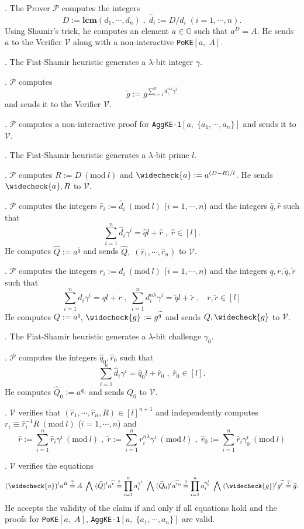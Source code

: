 \documentclass[11pt, lettersize, notitlepage, leqno, footskip=0.6cm]{article}
\newcommand{\pl}{\prod\limits}
\newcommand{\slim}{\sum\limits}
\newcommand{\wti}{\widetilde}
\newcommand{\mc}{\mathcal}
\newcommand{\mb}{\mathbb}
\newcommand{\mbf}{\mathbf}
\newcommand{\lam}{\lambda}
\newcommand{\what}{\widehat}
\newcommand{\weck}{\widecheck}
\newcommand{\vs}{\vspace{-0.15cm}}
\newcommand{\noin}{\noindent}
\newcommand{\sta}{\stackrel{?}{=}}
\newcommand{\Mod}[1]{\ (\mathrm{mod}\ #1)}
\newcommand{\LCM}{\mbf{lcm}}
\numberwithin{equation}{section}
\begin{document}
\begin{prf1} . The Prover $\mc{P}$ computes the integers \vs $$D:= \LCM(d_1,\cdots,d_n)\;,\;\what{d}_i:= D/d_i\;(i=1,\cdots,n).$$ Using Shamir's trick, he computes an element $a\in\mb{G}$ such that $a^D = A$. He sends $a$ to the Verifier $\mc{V}$ along with a non-interactive \verb|PoKE|$[a,\;A]$.

\noin 2. The Fiat-Shamir heuristic generates a $\lam$-bit integer $\gamma$.

\noin 3. $\mc{P}$ computes $$\wti{g}:= g^{\slim_{i=1}^n d_i^{n\lam}\gamma^i}$$ and sends it to the Verifier $\mc{V}$. 

\noin 4. $\mc{P}$ computes a non-interactive proof for \verb|AggKE-1|$[a,\;\{a_1,\cdots,a_n\}]$ and sends it to $\mc{V}$.

\noin 5. The Fiat-Shamir heuristic generates a $\lam$-bit prime $l$.

\noin 6. $\mc{P}$ computes $R:= D\Mod{l}$ and $\weck{a}:= a^{(D-R)/l}$. He sends $\weck{a}, R$ to $\mc{V}$.

\noin 7. $\mc{P}$ computes the integers $\what{r}_i:= \what{d}_i\Mod{l}$ ($i=1,\cdots,n$) and the integers $\what{q},\what{r}$ such that \vs $$\slim_{i=1}^n \what{d}_i\gamma^i = \what{q} l + \what{r}\;,\;\what{r}\in [l].$$ He computes $\what{Q}:= a^{\what{q}}$ and sends $\what{Q},\; (\what{r}_1,\cdots,\what{r}_n)$ to $\mc{V}$.

\noin 8. $\mc{P}$ computes the integers ${r}_i:= {d}_i\Mod{l}$ ($i=1,\cdots,n$) and the integers $q,r,\wti{q},\wti{r}$ such that \vs $$\slim_{i=1}^n d_i\gamma^i = ql+r\;,\;\slim_{i=1}^n {d}_i^{n\lam}\gamma^i = \wti{q}l+\wti{r}\;,\;\;\;r,\wti{r}\in[l] $$ He computes ${Q}:= a^q$, $\weck{g}:= g^{\wti{q}}$ and sends ${Q}, \weck{g}$ to $\mc{V}$.

\noin 9. The Fiat-Shamir heuristic generates a $\lam$-bit challenge $\gamma_0$.

\noin 10. $\mc{P}$ computes the integers $\what{q}_0,\what{r}_0$ such that \vs $$\slim_{i=1}^n \what{d}_i\gamma^i = \what{q}_0l+\what{r}_0\;,\;\what{r}_0\in[l].$$ He computes $\what{Q}_0:= a^{q_0}$ and sends ${Q}_0$ to $\mc{V}$.

\noin 11. $\mc{V}$ verifies that $(\what{r}_1,\cdots,\what{r}_n, R)\in [l]^{n+1}$ and independently computes $r_i\equiv \what{r}_i^{-1}R\Mod{l}$ ($i=1,\cdots,n$) and \vs $$\what{r}:= \slim_{i=1}^n \what{r}_i\gamma^i\Mod{l}\;,\;\wti{r}:= {\slim_{i=1}^n r_i^{n\lam}\gamma^i}\Mod{l}\;,\; \what{r}_0:= \slim_{i=1}^n \what{r}_i\gamma_0^i\Mod{l}$$

\noin 12. $\mc{V}$ verifies the equations \vs $$(\weck{a})^la^R\sta A  \;\bigwedge\; (\what{Q})^l a^{\what{r}}\sta \pl_{i=1}^{n} a_i^{\gamma^i}\;\bigwedge\;(\what{Q}_0)^la^{\what{r}_0}\sta \pl_{i=1}^{n} a_i^{\gamma_0^i} \;\bigwedge\; (\weck{g})^lg^{\wti{r}} \sta \wti{g}.$$ He accepts the validity of the claim if and only if all equations hold and the proofs for \verb|PoKE|$[a,\;A]$, \verb|AggKE-1|$[a,\;\{a_1,\cdots,a_n\}]$ are valid.\end{prf1}
\end{document}
